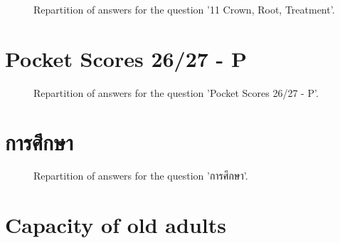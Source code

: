 \documentclass[12pt]{article}
\begin{document}
\label{sec:32}


\begin{figure}[h!]
    \caption{\label{figure:q32-1}Repartition of answers for the question '11
Crown, Root, Treatment'.}
\end{figure}



\clearpage{}
\section{Pocket Scores
26/27 - P}

\label{sec:65}


\begin{figure}[h!]
    \caption{\label{figure:q65-1}Repartition of answers for the question 'Pocket Scores
26/27 - P'.}
\end{figure}



\clearpage{}
\section{การศึกษา}

\label{sec:21}


\begin{figure}[h!]
    \caption{\label{figure:q21-1}Repartition of answers for the question 'การศึกษา'.}
\end{figure}



\clearpage{}
\section{Capacity of old adults}

\label{sec:22}
\end{document}
